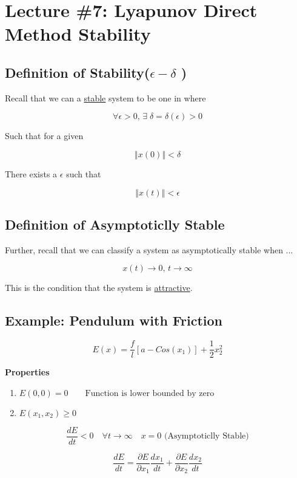 \section*{Lecture \#7: Lyapunov Direct Method Stability}


\subsection*{Definition of Stability($\epsilon - \delta$ )}
Recall that we can a \underline{stable} system to be one in where

$$
\forall \epsilon > 0 \text{, } \exists \; \delta = \delta(\epsilon) > 0
$$

\noindent Such that for a given

$$
\left\Vert x(0) \right\Vert < \delta
$$

\noindent There exists a $\epsilon$ such that

$$
\left\Vert x(t) \right\Vert < \epsilon
$$

\subsection*{Definition of Asymptoticlly Stable}
 Further, recall that we can classify a system as asymptotically stable when ...

 $$
x(t) \rightarrow 0 \text{, } t \rightarrow \infty
 $$

\noindent This is the condition that the system is \underline{attractive}.



\subsection*{Example: Pendulum with Friction}

$$
E(x) = \frac{f}{l}[a - Cos(x_1)] + \frac{1}{2}x_2^2
$$

\noindent \textbf{Properties}

\begin{enumerate}
  \item $E(0,0) = 0 \quad \quad \text{Function is lower bounded by zero} $
  \item $E(x_1, x_2) \geq 0 $
\end{enumerate}

$$
\frac{dE}{dt} < 0 \quad \forall t \rightarrow \infty \quad x =0 \text{ (Asymptoticlly Stable)}
$$

$$
\frac{dE}{dt} = \frac{\partial E}{\partial x_1} \frac{d x_1}{dt} + \frac{\partial E}{\partial x_2} \frac{d x_2}{dt}
$$

